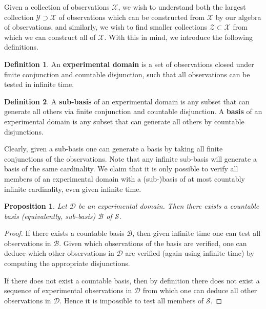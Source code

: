 \documentclass[review]{elsarticle}
\theoremstyle{plain}%
\newtheorem{prop}[thm]{Proposition}
\theoremstyle{definition}
\newtheorem{defn}{Definition}[section]
\theoremstyle{remark}
\begin{document}
Given a collection of observations $\mathcal{X}$, we wish to understand both the largest collection $\mathcal{Y}\supset\mathcal{X}$ of observations which can be constructed from $\mathcal{X}$ by our algebra of observations, and similarly, we wish to find smaller collections $\mathcal{Z}\subset\mathcal{X}$ from which we can construct all of $\mathcal{X}$. With this in mind, we introduce the following definitions.


\begin{defn}
	An \textbf{experimental domain} is a set of observations closed under finite conjunction and countable disjunction, such that all observations can be tested in infinite time. 
\end{defn}


\begin{defn}
	A \textbf{sub-basis} of an experimental domain is any subset that can generate all others via finite conjunction and countable disjunction. A \textbf{basis} of an experimental domain is any subset that can generate all others by countable disjunctions. 
\end{defn}

Clearly, given a sub-basis one can generate a basis by taking all finite conjunctions of the observations. Note that any infinite sub-basis will generate a basis of the same cardinality. We claim that it is only possible to verify all members of an experimental domain with a (sub-)basis of at most countably infinite cardinality, even given infinite time. 

\begin{prop}
Let $\mathcal{D}$ be an experimental domain. Then there exists a countable basis (equivalently, sub-basis) $\mathcal{B}$ of $\mathcal{S}$.
\end{prop}

\begin{proof}
If there exists a countable basis $\mathcal{B}$, then given infinite time one can test all observations in $\mathcal{B}$. Given which observations of the basis are verified, one can deduce which other observations in $\mathcal{D}$ are verified (again using infinite time) by computing the appropriate disjunctions. 

If there does not exist a countable basis, then by definition there does not exist a sequence of experimental observations in $\mathcal{D}$ from which one can deduce all other observations in $\mathcal{D}$. Hence it is impossible to test all members of $\mathcal{S}$.
\end{proof}
\end{document}
